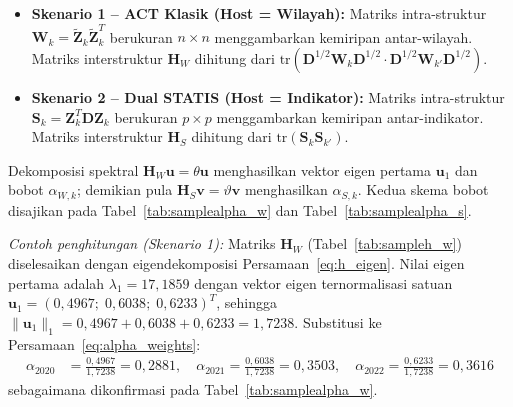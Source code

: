 \begin{itemize}
    \item \textbf{Skenario 1 -- ACT Klasik (Host = Wilayah):} Matriks intra-struktur $\mathbf{W}_k = \tilde{\mathbf{Z}}_k\tilde{\mathbf{Z}}_k^T$ berukuran $n \times n$ menggambarkan kemiripan antar-wilayah. Matriks interstruktur $\mathbf{H}_W$ dihitung dari $\text{tr}(\mathbf{D}^{1/2}\mathbf{W}_k\mathbf{D}^{1/2} \cdot \mathbf{D}^{1/2}\mathbf{W}_{k'}\mathbf{D}^{1/2})$.
    \item \textbf{Skenario 2 -- Dual STATIS (Host = Indikator):} Matriks intra-struktur $\mathbf{S}_k = \mathbf{Z}_k^T\mathbf{D}\mathbf{Z}_k$ berukuran $p \times p$ menggambarkan kemiripan antar-indikator. Matriks interstruktur $\mathbf{H}_S$ dihitung dari $\text{tr}(\mathbf{S}_k \mathbf{S}_{k'})$.
\end{itemize}

Dekomposisi spektral $\mathbf{H}_W \mathbf{u} = \theta \mathbf{u}$ menghasilkan vektor eigen pertama $\mathbf{u}_1$ dan bobot $\alpha_{W,k}$; demikian pula $\mathbf{H}_S \mathbf{v} = \vartheta \mathbf{v}$ menghasilkan $\alpha_{S,k}$. Kedua skema bobot disajikan pada Tabel~\ref{tab:samplealpha_w} dan Tabel~\ref{tab:samplealpha_s}.

\begin{table}[H]
\centering
\begin{minipage}[t]{0.45\textwidth}
  \centering
  
\end{minipage}%
\hfill
\begin{minipage}[t]{0.45\textwidth}
  \centering
  
\end{minipage}
\end{table}

\noindent\textit{Contoh penghitungan (Skenario 1):} Matriks $\mathbf{H}_W$ (Tabel~\ref{tab:sampleh_w}) diselesaikan dengan eigendekomposisi Persamaan~\ref{eq:h_eigen}. Nilai eigen pertama adalah $\lambda_1 = 17{,}1859$ dengan vektor eigen ternormalisasi satuan $\mathbf{u}_1 = (0{,}4967;\;0{,}6038;\;0{,}6233)^T$, sehingga $\|\mathbf{u}_1\|_1 = 0{,}4967+0{,}6038+0{,}6233 = 1{,}7238$. Substitusi ke Persamaan~\ref{eq:alpha_weights}:
\begin{align*}
  \alpha_{2020} &= \frac{0{,}4967}{1{,}7238} = 0{,}2881, \quad
  \alpha_{2021} = \frac{0{,}6038}{1{,}7238} = 0{,}3503, \quad
  \alpha_{2022} = \frac{0{,}6233}{1{,}7238} = 0{,}3616
\end{align*}
sebagaimana dikonfirmasi pada Tabel~\ref{tab:samplealpha_w}.

